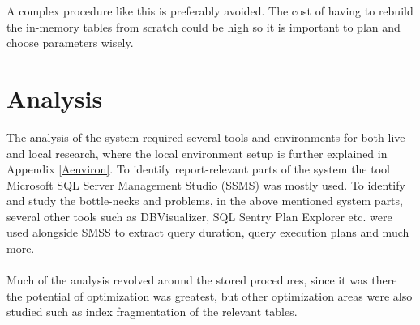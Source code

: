 \documentclass{cslthse-msc}
\begin{document}
A complex procedure like this is preferably avoided. The cost of having to rebuild the in-memory tables from scratch could be high so it is important to plan and choose parameters wisely.


\section{Analysis}\label{sec:analysis}
The analysis of the system required several tools and environments for both live and local research, where the local environment setup is further explained in Appendix \ref{Aenviron}. To identify report-relevant parts of the system the tool Microsoft SQL Server Management Studio (SSMS) was mostly used. To identify and study the bottle-necks and problems, in the above mentioned system parts, several other tools such as DBVisualizer, SQL Sentry Plan Explorer etc. were used alongside SMSS to extract query duration, query execution plans and much more.\\\\
Much of the analysis revolved around the stored procedures, since it was there the potential of optimization was greatest, but other optimization areas were also studied such as index fragmentation of the relevant tables.      
\end{document}
